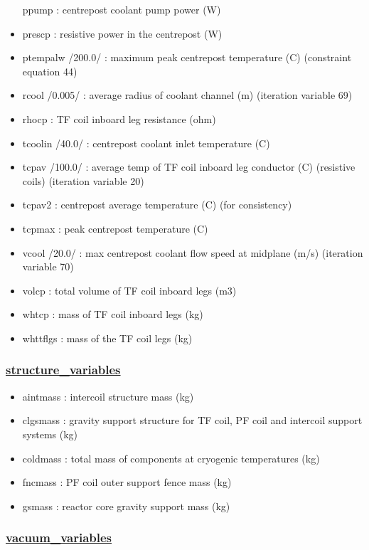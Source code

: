 \documentclass[]{article}
\begin{document}
\begin{itemize}
  ppump : centrepost coolant pump power (W)
\item
  prescp : resistive power in the centrepost (W)
\item
  ptempalw /200.0/ : maximum peak centrepost temperature (C) (constraint
  equation 44)
\item
  rcool /0.005/ : average radius of coolant channel (m) (iteration
  variable 69)
\item
  rhocp : TF coil inboard leg resistance (ohm)
\item
  tcoolin /40.0/ : centrepost coolant inlet temperature (C)
\item
  tcpav /100.0/ : average temp of TF coil inboard leg conductor (C)
  (resistive coils) (iteration variable 20)
\item
  tcpav2 : centrepost average temperature (C) (for consistency)
\item
  tcpmax : peak centrepost temperature (C)
\item
  vcool /20.0/ : max centrepost coolant flow speed at midplane (m/s)
  (iteration variable 70)
\item
  volcp : total volume of TF coil inboard legs (m3)
\item
  whtcp : mass of TF coil inboard legs (kg)
\item
  whttflgs : mass of the TF coil legs (kg)
\end{itemize}

\subsubsection{\href{structure_variables.html}{structure\_variables}}

\begin{itemize}
\itemsep1pt\parskip0pt
\item
  aintmass : intercoil structure mass (kg)
\item
  clgsmass : gravity support structure for TF coil, PF coil and
  intercoil support systems (kg)
\item
  coldmass : total mass of components at cryogenic temperatures (kg)
\item
  fncmass : PF coil outer support fence mass (kg)
\item
  gsmass : reactor core gravity support mass (kg)
\end{itemize}

\subsubsection{\href{vacuum_variables.html}{vacuum\_variables}}
\end{document}
